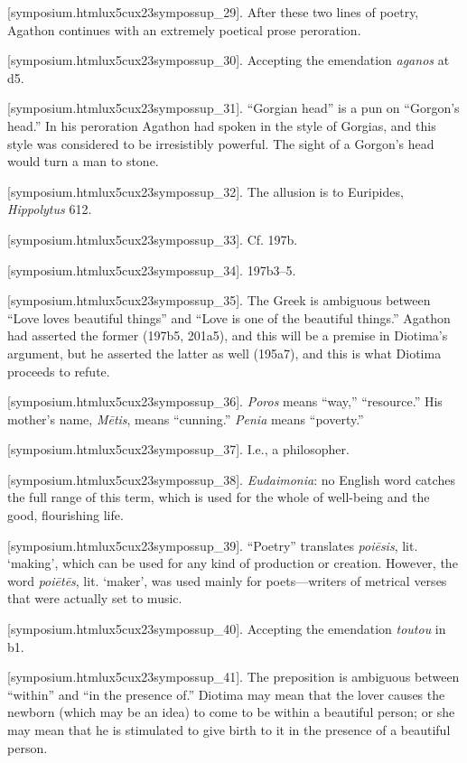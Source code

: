 [symposium.htmlux5cux23sympossup_29]. After these two lines of
poetry, Agathon continues with an extremely poetical prose peroration.

[symposium.htmlux5cux23sympossup_30]. Accepting the emendation
{\em aganos} at d5.

[symposium.htmlux5cux23sympossup_31]. “Gorgian head” is a pun
on “Gorgon's head.” In his peroration Agathon had spoken in the style of
Gorgias, and this style was considered to be irresistibly powerful. The
sight of a Gorgon's head would turn a man to stone.

[symposium.htmlux5cux23sympossup_32]. The allusion is to
Euripides, {\em Hippolytus} 612.

[symposium.htmlux5cux23sympossup_33]. Cf. 197b.

[symposium.htmlux5cux23sympossup_34]. 197b3--5.

[symposium.htmlux5cux23sympossup_35]. The Greek is ambiguous
between “Love loves beautiful things” and “Love is one of the beautiful
things.” Agathon had asserted the former (197b5, 201a5), and this will
be a premise in Diotima's argument, but he asserted the latter as well
(195a7), and this is what Diotima proceeds to refute.

[symposium.htmlux5cux23sympossup_36]. {\em Poros} means “way,”
“resource.” His mother's name, {\em Mētis}, means “cunning.” {\em Penia}
means “poverty.”

[symposium.htmlux5cux23sympossup_37]. I.e., a philosopher.

[symposium.htmlux5cux23sympossup_38]. {\em Eudaimonia}: no
English word catches the full range of this term, which is used for the
whole of well-being and the good, flourishing life.

[symposium.htmlux5cux23sympossup_39]. “Poetry” translates
{\em poiēsis}, lit. ‘making', which can be used for any kind of
production or creation. However, the word {\em poiētēs}, lit. ‘maker',
was used mainly for poets---writers of metrical verses that were
actually set to music.

[symposium.htmlux5cux23sympossup_40]. Accepting the emendation
{\em toutou} in b1.

[symposium.htmlux5cux23sympossup_41]. The preposition is
ambiguous between “within” and “in the presence of.” Diotima may mean
that the lover causes the newborn (which may be an idea) to come to be
within a beautiful person; or she may mean that he is stimulated to give
birth to it in the presence of a beautiful person.

